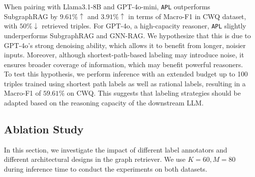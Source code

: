 \documentclass{article}
\theoremstyle{plain}
\theoremstyle{definition}
\theoremstyle{remark}
\newcommand{\proj}{\texttt{\scalebox{1.03}{R}APL}}
\begin{document}
 When pairing with Llama3.1-8B and GPT-4o-mini, \proj{} outperforms SubgraphRAG by $9.61\%\! \uparrow$ and $3.91\% \!\uparrow$ in terms of Macro-F1 in CWQ dataset, with $50\% \!\!\downarrow$ retrieved triples. 
 For GPT-4o, a high-capacity reasoner, \proj{} slightly underperforms SubgraphRAG and GNN-RAG. We hypothesize that this is due to GPT-4o’s strong denoising ability, which allows it to benefit from longer, noisier inputs. Moreover, although shortest-path-based labeling may introduce noise, it ensures broader coverage of information, which may benefit powerful reasoners. To test this hypothesis, we perform inference with an extended budget up to 100 triples trained using shortest path labels as well as rational labels, resulting in a Macro-F1 of $59.61\%$ on CWQ. This suggests that labeling strategies should be adapted based on the reasoning capacity of the downstream LLM.

\subsection{Ablation Study}
\label{sec:label_annotator}
In this section, we investigate the impact of different label annotators and different architectural designs in the graph retriever. We use $K=60,M=80$ during inference time to conduct the experiments on both datasets.
\end{document}

